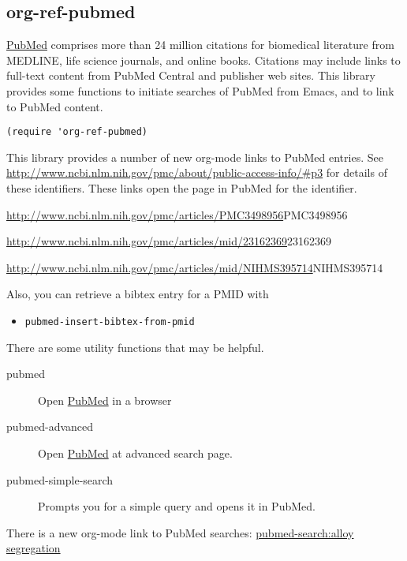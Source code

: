 \documentclass[11pt]{article}
\begin{document}
\subsection{org-ref-pubmed}
\label{sec:orgb6ade8c}

\href{http://www.ncbi.nlm.nih.gov/pubmed}{PubMed} comprises more than 24 million citations for biomedical literature from MEDLINE, life science journals, and online books. Citations may include links to full-text content from PubMed Central and publisher web sites. This library provides some functions to initiate searches of PubMed from Emacs, and to link to PubMed content.

\begin{verbatim}
(require 'org-ref-pubmed)
\end{verbatim}

This library provides a number of new org-mode links to PubMed entries. See \url{http://www.ncbi.nlm.nih.gov/pmc/about/public-access-info/\#p3} for details of these identifiers. These links open the page in PubMed for the identifier.

\url{http://www.ncbi.nlm.nih.gov/pmc/articles/PMC3498956}{PMC3498956}

\url{http://www.ncbi.nlm.nih.gov/pmc/articles/mid/23162369}{23162369}

\url{http://www.ncbi.nlm.nih.gov/pmc/articles/mid/NIHMS395714}{NIHMS395714}

Also, you can retrieve a bibtex entry for a PMID with

\begin{itemize}
\item \texttt{pubmed-insert-bibtex-from-pmid}
\end{itemize}

There are some utility functions that may be helpful.

\begin{description}
\item[{pubmed}] Open \href{http://www.ncbi.nlm.nih.gov/pubmed}{PubMed} in a browser
\item[{pubmed-advanced}] Open \href{http://www.ncbi.nlm.nih.gov/pubmed/advanced}{PubMed} at advanced search page.
\item[{pubmed-simple-search}] Prompts you for a simple query and opens it in PubMed.
\end{description}

There is a new org-mode link to PubMed searches: \href{http://www.ncbi.nlm.nih.gov/pubmed/?term=alloy%20segregation}{pubmed-search:alloy segregation}
\end{document}
